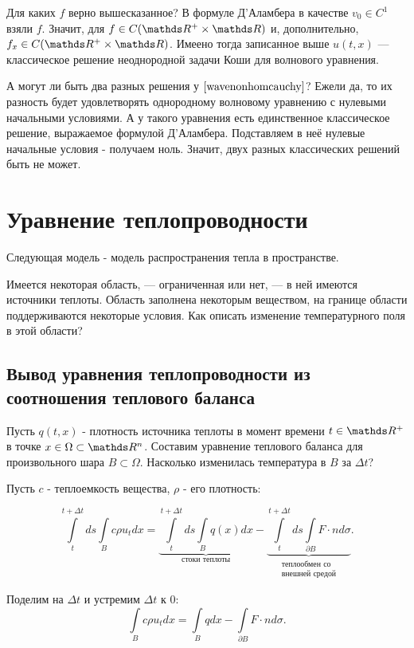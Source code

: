 Для каких $f$ верно вышесказанное? В формуле Д'Аламбера в качестве $v_0 \in C^1$ взяли $f$. Значит, для $f \in C(\real^+ \times \real)$ и, дополнительно, $f_x \in C(\real^+ \times \real)$. Имеено тогда записанное выше $u(t,x)$ --- классическое решение неоднородной задачи Коши для волнового уравнения.

А могут ли быть два разных решения у $\eqref{wavenonhomcauchy}$? Ежели да, то их разность будет удовлетворять однородному волновому уравнению с нулевыми начальными условиями. А у такого уравнения есть единственное классическое решение, выражаемое формулой Д'Аламбера. Подставляем в неё нулевые начальные условия - получаем ноль. Значит, двух разных классических решений быть не может.

\section{Уравнение теплопроводности}
Следующая модель - модель распространения тепла в пространстве.

Имеется некоторая область, --- ограниченная или нет, --- в ней имеются источники теплоты. Область заполнена некоторым веществом, на границе области поддерживаются некоторые условия. Как описать изменение температурного поля в этой области?

\subsection{Вывод уравнения теплопроводности из соотношения теплового баланса}

Пусть $q(t,x)$ - плотность источника теплоты в момент времени $t \in \real^+$ в точке $x \in \Omega \subset \real^n$. Составим уравнение теплового баланса для произвольного шара $B \subset \Omega$. Насколько изменилась температура в $B$ за $\Delta t$?

Пусть $c$ - теплоемкость вещества, $\rho$ - его плотность:

$$ \int \limits_t^{t +\Delta t} ds \int \limits_B  c \rho u_t dx = \underbrace {\int \limits_t^{t + \Delta t} ds \int \limits_B q(x) dx}_{\text{стоки теплоты}} - \underbrace {\int \limits_t^{t + \Delta t} ds \int \limits_{\partial B} F \cdot n d \sigma}_{\substack{\text{теплообмен со} \\ \text{внешней средой}}}.$$

Поделим на $\Delta t$ и устремим $\Delta t$ к $0$:
$$ \int \limits_B c \rho u_t dx = \int \limits_B q dx - \int \limits_{\partial B} F \cdot n d \sigma. $$

